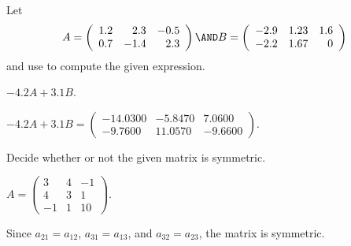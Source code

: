 \documentclass{article}
\begin{document}
\matlabproblemlabel

\noindent Let  \[ A = \left(\begin{array}{rrr} 1.2 & 2.3 & -0.5\\ 0.7 & -1.4 & 2.3 \end{array}\right) \AND B = \left(\begin{array}{rrr} -2.9 & 1.23 & 1.6\\ -2.2 & 1.67 & 0 \end{array}\right) \] and use \Matlab to compute the given expression.

\begin{computerExercise}  \label{c1.2.4a}
$-4.2A+3.1B$.

\begin{solution}
$-4.2A + 3.1B = \left(\begin{array}{rrr} 
-14.0300 & -5.8470 &    7.0600 \\
 -9.7600 & 11.0570 &   -9.6600\end{array}\right)$.

\end{solution}
\end{computerExercise}





\problemlabel

\noindent Decide whether or not the given matrix is symmetric.

\begin{exercise} \label{c1.1.01e}
 $A = \left( \begin{array}{rrr}
 3 & 4 & -1\\
 4 & 3 &  1\\
 -1 & 1 & 10\end{array} \right)$.
  \begin{multipleChoice}
  \end{multipleChoice}
       

\begin{solution}
Since $a_{21} = a_{12}$, $a_{31} = a_{13}$, and $a_{32} = a_{23}$, the matrix is symmetric.

\end{solution}
\end{exercise}


\end{document}

